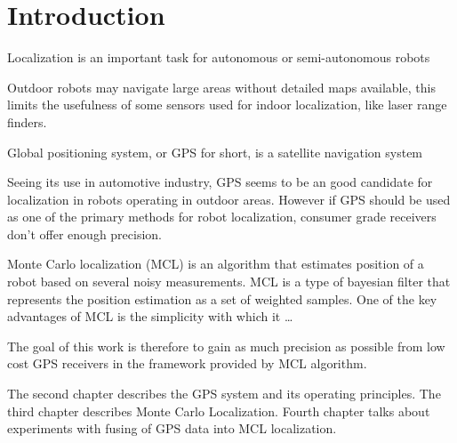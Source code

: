 \chapter{Introduction}

Localization is an important task for autonomous or semi-autonomous robots

Outdoor robots may navigate large areas without detailed maps available, this limits
the usefulness of some sensors used for indoor localization, like laser range finders.

Global positioning system, or GPS for short, is a satellite navigation system


Seeing its use in automotive industry, GPS seems to be an good candidate for
localization in robots operating in outdoor areas.
However if GPS should be used as one of the primary methods for robot localization,
consumer grade receivers don't offer enough precision.

Monte Carlo localization (MCL) is an algorithm that estimates position of a robot
based on several noisy measurements.
MCL is a type of bayesian filter that represents
the position estimation as a set of weighted samples.
One of the key advantages of MCL is the simplicity with which it \ldots

The goal of this work is therefore to gain as much precision as possible from low cost
GPS receivers in the framework provided by MCL algorithm.

The second chapter describes the GPS system and its operating principles.
The third chapter describes Monte Carlo Localization.
Fourth chapter talks about experiments with fusing of GPS data into
MCL localization.
